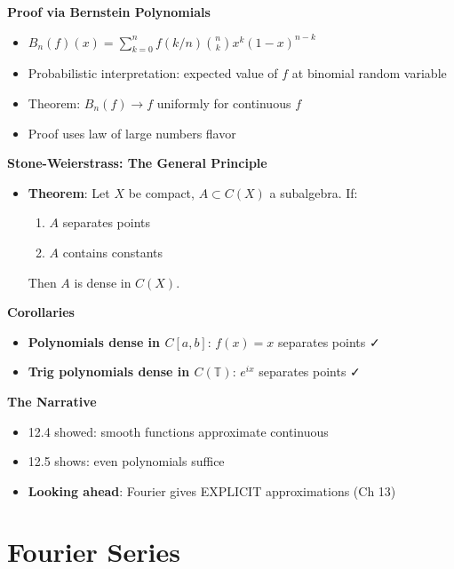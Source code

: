 \documentclass[
  10pt,
  letterpaper,
]{scrbook}
\providecommand{\tightlist}{%
  \setlength{\itemsep}{0pt}\setlength{\parskip}{0pt}}
\begin{document}
\textbf{Proof via Bernstein Polynomials}

\begin{itemize}
\tightlist
\item
  \(B_n(f)(x) = \sum_{k=0}^n f(k/n) \binom{n}{k} x^k (1-x)^{n-k}\)
\item
  Probabilistic interpretation: expected value of \(f\) at binomial
  random variable
\item
  Theorem: \(B_n(f) \to f\) uniformly for continuous \(f\)
\item
  Proof uses law of large numbers flavor
\end{itemize}

\textbf{Stone-Weierstrass: The General Principle}

\begin{itemize}
\tightlist
\item
  \textbf{Theorem}: Let \(X\) be compact, \(A \subset C(X)\) a
  subalgebra. If:

  \begin{enumerate}
  \def\labelenumi{\arabic{enumi}.}
  \tightlist
  \item
    \(A\) separates points
  \item
    \(A\) contains constants
  \end{enumerate}

  Then \(A\) is dense in \(C(X)\).
\end{itemize}

\textbf{Corollaries}

\begin{itemize}
\tightlist
\item
  \textbf{Polynomials dense in \(C[a,b]\)}: \(f(x) = x\) separates
  points ✓
\item
  \textbf{Trig polynomials dense in \(C(\mathbb{T})\)}: \(e^{ix}\)
  separates points ✓
\end{itemize}

\textbf{The Narrative}

\begin{itemize}
\tightlist
\item
  12.4 showed: smooth functions approximate continuous
\item
  12.5 shows: even polynomials suffice
\item
  \textbf{Looking ahead}: Fourier gives EXPLICIT approximations (Ch 13)
\end{itemize}

\chapter{Fourier Series}\label{fourier-series}
\end{document}

